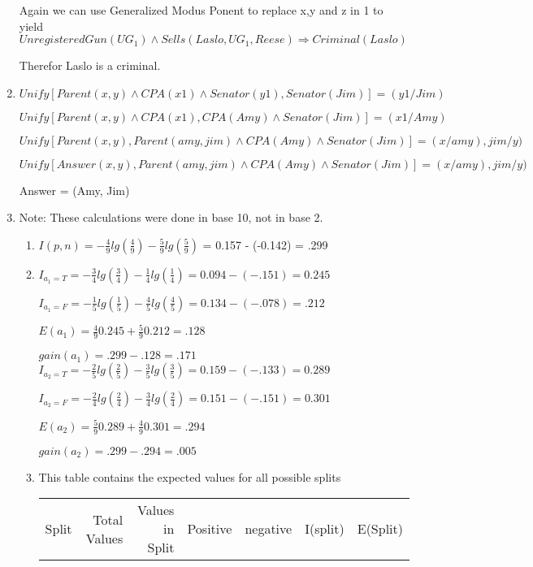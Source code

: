 \documentclass[11pt,fleqn]{article}
\begin{document}
\begin{enumerate}
Again we can use Generalized Modus Ponent to replace x,y and z in 1 to yield
$UnregisteredGun( UG_{1}) \land Sells(Laslo, UG_{1},Reese) \Rightarrow Criminal(Laslo) $

Therefor Laslo is a criminal. 

\item %

$Unify[Parent(x,y) \land CPA(x1) \land Senator(y1), Senator(Jim)] = (y1/Jim)$

$Unify[Parent(x,y) \land CPA(x1) , CPA(Amy) \land Senator(Jim) ] = (x1/Amy)$

$Unify[Parent(x,y) , Parent(amy,jim) \land CPA(Amy) \land Senator(Jim)] = (x/amy), jim/y)$

$Unify[Answer(x,y) , Parent(amy,jim) \land CPA(Amy) \land Senator(Jim)] = (x/amy), jim/y)$

Answer = (Amy, Jim) 


\item %
Note: These calculations were done in base 10, not in base 2. 
\begin{enumerate}
\item 
$I(p,n) = -\frac{4}{9}lg(\frac{4}{9}) - \frac{5}{9}lg(\frac{5}{9})$ = 0.157 - (-0.142) = .299 
\item 
$I_{a_{1}=T} = -\frac{3}{4}lg(\frac{3}{4}) - \frac{1}{4}lg(\frac{1}{4}) = 0.094 - (-.151) = 0.245$

$I_{a_{1}=F} = -\frac{1}{5}lg(\frac{1}{5}) - \frac{4}{5}lg(\frac{4}{5}) = 0.134 - (-.078) = .212$

$E(a_{1}) = \frac{4}{9}0.245 + \frac{5}{9}0.212 = .128$

$gain(a_{1}) = .299 - .128 = .171$
\\
 
$I_{a_{2}=T} = -\frac{2}{5}lg(\frac{2}{5}) - \frac{3}{5}lg(\frac{3}{5}) = 0.159 - (-.133) = 0.289$

$I_{a_{2}=F} = -\frac{2}{4}lg(\frac{2}{4}) - \frac{3}{4}lg(\frac{2}{4}) = 0.151 - (-.151) = 0.301$

$E(a_{2}) = \frac{5}{9}0.289 + \frac{4}{9}0.301 = .294$

$gain(a_{2}) = .299 - .294 = .005$
\item 
This table contains the expected values for all possible splits\\
\begin{table}[h]
\begin{tabular}{rrrrrrr}

     Split & Total Values & Values in Split &   Positive &   negative &   I(split) &   E(Split) \\


\end{tabular}
\end{table}
\end{enumerate}
\end{enumerate}
\end{document}
